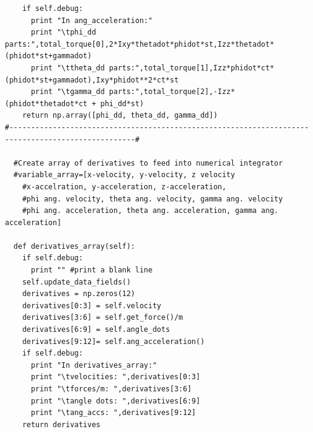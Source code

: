 \documentclass[a4paper,12pt, oneside]{article}
\begin{document}
\begin{verbatim}
    if self.debug:
      print "In ang_acceleration:"
      print "\tphi_dd parts:",total_torque[0],2*Ixy*thetadot*phidot*st,Izz*thetadot*(phidot*st+gammadot)
      print "\ttheta_dd parts:",total_torque[1],Izz*phidot*ct*(phidot*st+gammadot),Ixy*phidot**2*ct*st
      print "\tgamma_dd parts:",total_torque[2],-Izz*(phidot*thetadot*ct + phi_dd*st)
    return np.array([phi_dd, theta_dd, gamma_dd])
#---------------------------------------------------------------------------------------------------#

  #Create array of derivatives to feed into numerical integrator
  #variable_array=[x-velocity, y-velocity, z velocity
    #x-accelration, y-acceleration, z-acceleration,
    #phi ang. velocity, theta ang. velocity, gamma ang. velocity
    #phi ang. acceleration, theta ang. acceleration, gamma ang. acceleration]

  def derivatives_array(self):
    if self.debug:
      print "" #print a blank line
    self.update_data_fields()
    derivatives = np.zeros(12)
    derivatives[0:3] = self.velocity
    derivatives[3:6] = self.get_force()/m
    derivatives[6:9] = self.angle_dots
    derivatives[9:12]= self.ang_acceleration()
    if self.debug:
      print "In derivatives_array:"
      print "\tvelocities: ",derivatives[0:3]
      print "\tforces/m: ",derivatives[3:6]
      print "\tangle dots: ",derivatives[6:9]
      print "\tang_accs: ",derivatives[9:12]
    return derivatives


\end{verbatim}
\end{document}
